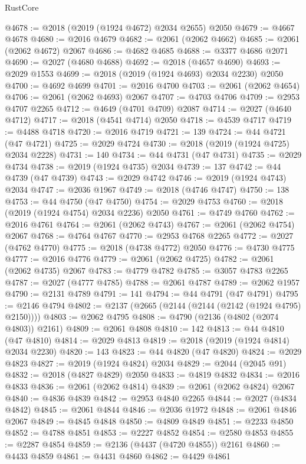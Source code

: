 \begin{lexlean}{RustCore}
\begin{coremodule}
@4678 := @2018 (@2019 (@1924 @4672) @2034 @2655) @2050
@4679 := @4667 @4678
@4680 := @2016 @4679
@4682 := @2061 (@2062 @4662)
@4685 := @2061 (@2062 @4672) @2067
@4686 := @4682 @4685
@4688 := @3377 @4686 @2071
@4690 := @2027 (@4680 @4688)
@4692 := @2018 (@4657 @4690)
@4693 := @2029 @1553
@4699 := @2018 (@2019 (@1924 @4693) @2034 @2230) @2050
@4700 := @4692 @4699
@4701 := @2016 @4700
@4703 := @2061 (@2062 @4654)
@4706 := @2061 (@2062 @4693) @2067
@4707 := @4703 @4706
@4709 := @2953 @4707 @2265
@4712 := @4649 (@4701 @4709) @2087
@4714 := @2027 (@4640 @4712)
@4717 := @2018 (@4541 @4714) @2050
@4718 := @4539 @4717
@4719 := @4488 @4718
@4720 := @2016 @4719
@4721 := 139
@4724 := @44 @4721 (@47 @4721)
@4725 := @2029 @4724
@4730 := @2018 (@2019 (@1924 @4725) @2034 @2228)
@4731 := 140
@4734 := @44 @4731 (@47 @4731)
@4735 := @2029 @4734
@4738 := @2019 (@1924 @4735) @2034
@4739 := 137
@4742 := @44 @4739 (@47 @4739)
@4743 := @2029 @4742
@4746 := @2019 (@1924 @4743) @2034
@4747 := @2036 @1967
@4749 := @2018 (@4746 @4747)
@4750 := 138
@4753 := @44 @4750 (@47 @4750)
@4754 := @2029 @4753
@4760 := @2018 (@2019 (@1924 @4754) @2034 @2236) @2050
@4761 := @4749 @4760
@4762 := @2016 @4761
@4764 := @2061 (@2062 @4743)
@4767 := @2061 (@2062 @4754) @2067
@4768 := @4764 @4767
@4770 := @2953 @4768 @2265
@4772 := @2027 (@4762 @4770)
@4775 := @2018 (@4738 @4772) @2050
@4776 := @4730 @4775
@4777 := @2016 @4776
@4779 := @2061 (@2062 @4725)
@4782 := @2061 (@2062 @4735) @2067
@4783 := @4779 @4782
@4785 := @3057 @4783 @2265
@4787 := @2027 (@4777 @4785)
@4788 := @2061 @4787
@4789 := @2062 @1957
@4790 := @2131 @4789
@4791 := 141
@4794 := @44 @4791 (@47 @4791)
@4795 := @2146 @4794
@4802 := @2137 (@2665 (@2144 (@2144 (@2142 (@1924 @4795) @2150))))
@4803 := @2062 @4795
@4808 := @4790 (@2136 (@4802 (@2074 @4803)) @2161)
@4809 := @2061 @4808
@4810 := 142
@4813 := @44 @4810 (@47 @4810)
@4814 := @2029 @4813
@4819 := @2018 (@2019 (@1924 @4814) @2034 @2230)
@4820 := 143
@4823 := @44 @4820 (@47 @4820)
@4824 := @2029 @4823
@4827 := @2019 (@1924 @4824) @2034
@4829 := @2044 (@2045 @91)
@4832 := @2018 (@4827 @4829) @2050
@4833 := @4819 @4832
@4834 := @2016 @4833
@4836 := @2061 (@2062 @4814)
@4839 := @2061 (@2062 @4824) @2067
@4840 := @4836 @4839
@4842 := @2953 @4840 @2265
@4844 := @2027 (@4834 @4842)
@4845 := @2061 @4844
@4846 := @2036 @1972
@4848 := @2061 @4846 @2067
@4849 := @4845 @4848
@4850 := @4809 @4849
@4851 := @2233 @4850
@4852 := @4788 @4851
@4853 := @2227 @4852
@4854 := @2580 @4853
@4855 := @2287 @4854
@4859 := @2136 (@4437 (@4720 @4855)) @2161
@4860 := @4433 @4859
@4861 := @4431 @4860
@4862 := @4429 @4861

\end{coremodule}
\end{lexlean}
